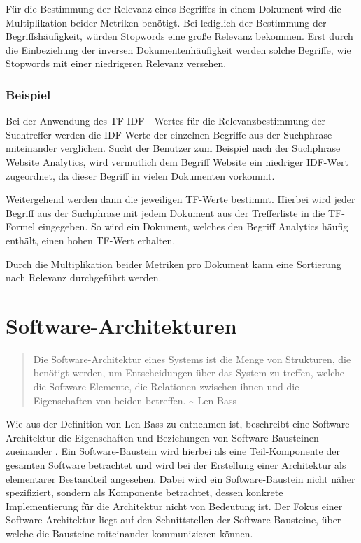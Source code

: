 Für die Bestimmung der Relevanz eines Begriffes in einem Dokument wird die Multiplikation beider Metriken benötigt. Bei lediglich der Bestimmung der Begriffshäufigkeit, würden Stopwords eine große Relevanz bekommen. Erst durch die Einbeziehung der inversen Dokumentenhäufigkeit werden solche Begriffe, wie Stopwords mit einer niedrigeren Relevanz versehen.

\subsubsection{Beispiel}

Bei der Anwendung des TF-IDF - Wertes für die Relevanzbestimmung der Suchtreffer werden die IDF-Werte der einzelnen Begriffe aus der Suchphrase miteinander verglichen. Sucht der Benutzer zum Beispiel nach der Suchphrase \glqq Website Analytics\grqq{}, wird vermutlich dem Begriff \glqq Website\grqq{} ein niedriger IDF-Wert zugeordnet, da dieser Begriff in vielen Dokumenten vorkommt.

Weitergehend werden dann die jeweiligen TF-Werte bestimmt. Hierbei wird jeder Begriff aus der Suchphrase mit jedem Dokument aus der Trefferliste in die TF-Formel eingegeben. So wird ein Dokument, welches den Begriff \glqq Analytics\grqq{} häufig enthält, einen hohen TF-Wert erhalten.

Durch die Multiplikation beider Metriken pro Dokument kann eine Sortierung nach Relevanz durchgeführt werden.

\section{Software-Architekturen\label{sec2.2:Unterpunkt-2}}

\begin{quote}
    Die Software-Architektur eines Systems ist die Menge von Strukturen, die benötigt werden, um Entscheidungen über das System zu treffen, welche die Software-Elemente, die Relationen zwischen ihnen und die Eigenschaften von beiden betreffen. \textasciitilde{} Len Bass \cite[S. 4]{Bass.2013}
\end{quote}

Wie aus der Definition von Len Bass zu entnehmen ist, beschreibt eine Software-Architektur die Eigenschaften und Beziehungen von Software-Bausteinen zueinander \cite[S. 4]{Bass.2013}. Ein Software-Baustein wird hierbei als eine Teil-Komponente der gesamten Software betrachtet und wird bei der Erstellung einer Architektur als elementarer Bestandteil angesehen. Dabei wird ein Software-Baustein nicht näher spezifiziert, sondern als Komponente betrachtet, dessen konkrete Implementierung für die Architektur nicht von Bedeutung ist. Der Fokus einer Software-Architektur liegt auf den Schnittstellen der Software-Bausteine, über welche die Bausteine miteinander kommunizieren können.

